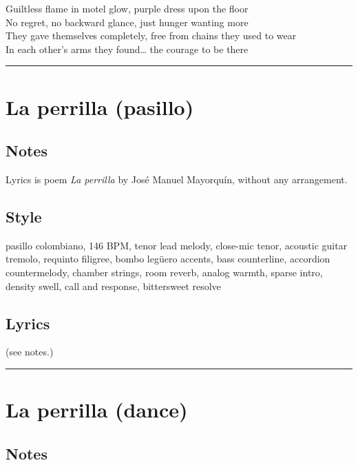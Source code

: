 Guiltless flame in motel glow, purple dress upon the floor\\
No regret, no backward glance, just hunger wanting more\\
They gave themselves completely, free from chains they used to wear\\
In each other's arms they found\ldots{} the courage to be there

\begin{center}\rule{0.5\linewidth}{0.5pt}\end{center}

\section{La perrilla (pasillo)}\label{la-perrilla-pasillo}

\subsection{Notes}\label{notes-37}

Lyrics is poem \emph{La perrilla} by José Manuel Mayorquín, without any
arrangement.

\subsection{Style}\label{style-36}

pasillo colombiano, 146 BPM, tenor lead melody, close-mic tenor,
acoustic guitar tremolo, requinto filigree, bombo legüero accents, bass
counterline, accordion countermelody, chamber strings, room reverb,
analog warmth, sparse intro, density swell, call and response,
bittersweet resolve

\subsection{Lyrics}\label{lyrics-36}

(see notes.)

\begin{center}\rule{0.5\linewidth}{0.5pt}\end{center}

\section{La perrilla (dance)}\label{la-perrilla-dance}

\subsection{Notes}\label{notes-38}

